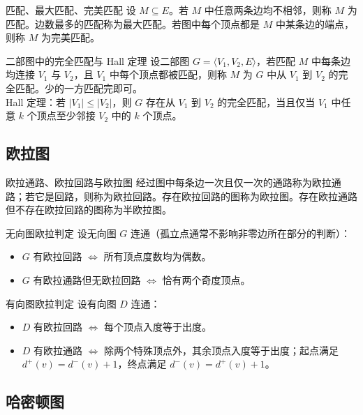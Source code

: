 \documentclass[UTF8,zihao=-4]{ctexart}
\begin{document}
\begin{corebox}{匹配、最大匹配、完美匹配}
设 $M\subseteq E$。若 $M$ 中任意两条边均不相邻，则称 $M$ 为匹配。边数最多的匹配称为最大匹配。若图中每个顶点都是 $M$ 中某条边的端点，则称 $M$ 为完美匹配。
\end{corebox}

\begin{corebox}{二部图中的完全匹配与 Hall 定理}
设二部图 $G=\langle V_1,V_2,E\rangle$，若匹配 $M$ 中每条边均连接 $V_1$ 与 $V_2$，且 $V_1$ 中每个顶点都被匹配，则称 $M$ 为 $G$ 中从 $V_1$ 到 $V_2$ 的完全匹配。少的一方匹配完即可。\\
Hall 定理：若 $|V_1|\le |V_2|$，则 $G$ 存在从 $V_1$ 到 $V_2$ 的完全匹配，当且仅当 $V_1$ 中任意 $k$ 个顶点至少邻接 $V_2$ 中的 $k$ 个顶点。
\end{corebox}

\subsection{欧拉图}

\begin{corebox}{欧拉通路、欧拉回路与欧拉图}
经过图中每条边一次且仅一次的通路称为欧拉通路；若它是回路，则称为欧拉回路。存在欧拉回路的图称为欧拉图。存在欧拉通路但不存在欧拉回路的图称为半欧拉图。
\end{corebox}

\begin{corebox}{无向图欧拉判定}
设无向图 $G$ 连通（孤立点通常不影响非零边所在部分的判断）：
\begin{itemize}
  \item $G$ 有欧拉回路 $\Leftrightarrow$ 所有顶点度数均为偶数。
  \item $G$ 有欧拉通路但无欧拉回路 $\Leftrightarrow$ 恰有两个奇度顶点。
\end{itemize}
\end{corebox}

\begin{corebox}{有向图欧拉判定}
设有向图 $D$ 连通：
\begin{itemize}
  \item $D$ 有欧拉回路 $\Leftrightarrow$ 每个顶点入度等于出度。
  \item $D$ 有欧拉通路 $\Leftrightarrow$ 除两个特殊顶点外，其余顶点入度等于出度；起点满足 $d^+(v)=d^-(v)+1$，终点满足 $d^-(v)=d^+(v)+1$。
\end{itemize}
\end{corebox}

\subsection{哈密顿图}
\end{document}
